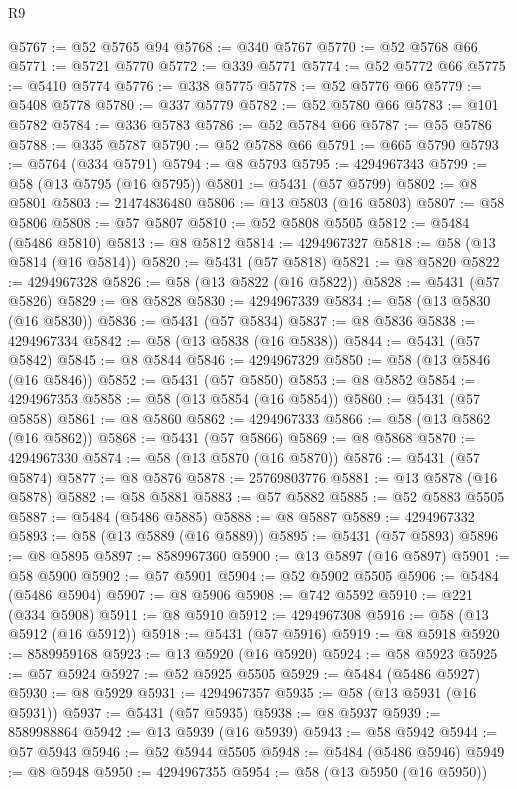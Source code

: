 \begin{lexlean}{R9}
\begin{coremodule}
@5767 := @52 @5765 @94
@5768 := @340 @5767
@5770 := @52 @5768 @66
@5771 := @5721 @5770
@5772 := @339 @5771
@5774 := @52 @5772 @66
@5775 := @5410 @5774
@5776 := @338 @5775
@5778 := @52 @5776 @66
@5779 := @5408 @5778
@5780 := @337 @5779
@5782 := @52 @5780 @66
@5783 := @101 @5782
@5784 := @336 @5783
@5786 := @52 @5784 @66
@5787 := @55 @5786
@5788 := @335 @5787
@5790 := @52 @5788 @66
@5791 := @665 @5790
@5793 := @5764 (@334 @5791)
@5794 := @8 @5793
@5795 := 4294967343
@5799 := @58 (@13 @5795 (@16 @5795))
@5801 := @5431 (@57 @5799)
@5802 := @8 @5801
@5803 := 21474836480
@5806 := @13 @5803 (@16 @5803)
@5807 := @58 @5806
@5808 := @57 @5807
@5810 := @52 @5808 @5505
@5812 := @5484 (@5486 @5810)
@5813 := @8 @5812
@5814 := 4294967327
@5818 := @58 (@13 @5814 (@16 @5814))
@5820 := @5431 (@57 @5818)
@5821 := @8 @5820
@5822 := 4294967328
@5826 := @58 (@13 @5822 (@16 @5822))
@5828 := @5431 (@57 @5826)
@5829 := @8 @5828
@5830 := 4294967339
@5834 := @58 (@13 @5830 (@16 @5830))
@5836 := @5431 (@57 @5834)
@5837 := @8 @5836
@5838 := 4294967334
@5842 := @58 (@13 @5838 (@16 @5838))
@5844 := @5431 (@57 @5842)
@5845 := @8 @5844
@5846 := 4294967329
@5850 := @58 (@13 @5846 (@16 @5846))
@5852 := @5431 (@57 @5850)
@5853 := @8 @5852
@5854 := 4294967353
@5858 := @58 (@13 @5854 (@16 @5854))
@5860 := @5431 (@57 @5858)
@5861 := @8 @5860
@5862 := 4294967333
@5866 := @58 (@13 @5862 (@16 @5862))
@5868 := @5431 (@57 @5866)
@5869 := @8 @5868
@5870 := 4294967330
@5874 := @58 (@13 @5870 (@16 @5870))
@5876 := @5431 (@57 @5874)
@5877 := @8 @5876
@5878 := 25769803776
@5881 := @13 @5878 (@16 @5878)
@5882 := @58 @5881
@5883 := @57 @5882
@5885 := @52 @5883 @5505
@5887 := @5484 (@5486 @5885)
@5888 := @8 @5887
@5889 := 4294967332
@5893 := @58 (@13 @5889 (@16 @5889))
@5895 := @5431 (@57 @5893)
@5896 := @8 @5895
@5897 := 8589967360
@5900 := @13 @5897 (@16 @5897)
@5901 := @58 @5900
@5902 := @57 @5901
@5904 := @52 @5902 @5505
@5906 := @5484 (@5486 @5904)
@5907 := @8 @5906
@5908 := @742 @5592
@5910 := @221 (@334 @5908)
@5911 := @8 @5910
@5912 := 4294967308
@5916 := @58 (@13 @5912 (@16 @5912))
@5918 := @5431 (@57 @5916)
@5919 := @8 @5918
@5920 := 8589959168
@5923 := @13 @5920 (@16 @5920)
@5924 := @58 @5923
@5925 := @57 @5924
@5927 := @52 @5925 @5505
@5929 := @5484 (@5486 @5927)
@5930 := @8 @5929
@5931 := 4294967357
@5935 := @58 (@13 @5931 (@16 @5931))
@5937 := @5431 (@57 @5935)
@5938 := @8 @5937
@5939 := 8589988864
@5942 := @13 @5939 (@16 @5939)
@5943 := @58 @5942
@5944 := @57 @5943
@5946 := @52 @5944 @5505
@5948 := @5484 (@5486 @5946)
@5949 := @8 @5948
@5950 := 4294967355
@5954 := @58 (@13 @5950 (@16 @5950))

\end{coremodule}
\end{lexlean}
